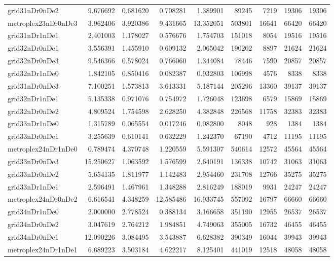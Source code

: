 \begin{longtable}{|l|r|r|r|r|r|r|r|r|}
grid31nDr0nDe2 & 9.676692 & 0.681620 & 0.708281 & 1.389901 & 89245 & 7219 & 19306 & 19306 \\
metroplex23nDr0nDe3 & 3.962406 & 3.920386 & 9.431665 & 13.352051 & 503801 & 16641 & 66420 & 66420 \\
grid31nDr1nDe1 & 2.401003 & 1.178027 & 0.576676 & 1.754703 & 151018 & 8054 & 19516 & 19516 \\
grid32nDr0nDe1 & 3.556391 & 1.455910 & 0.609132 & 2.065042 & 190202 & 8897 & 21624 & 21624 \\
grid32nDr0nDe3 & 9.546366 & 0.578024 & 0.766060 & 1.344084 & 78446 & 7590 & 20857 & 20857 \\
grid32nDr1nDe0 & 1.842105 & 0.850416 & 0.082387 & 0.932803 & 106998 & 4576 & 8338 & 8338 \\
grid31nDr0nDe3 & 7.100251 & 1.573813 & 3.613331 & 5.187144 & 205296 & 13360 & 39137 & 39137 \\
grid32nDr1nDe1 & 5.135338 & 0.971076 & 0.754972 & 1.726048 & 123698 & 6579 & 15869 & 15869 \\
grid32nDr0nDe2 & 4.809524 & 1.754598 & 2.628250 & 4.382848 & 226568 & 11758 & 32383 & 32383 \\
grid33nDr1nDe0 & 1.315789 & 0.065554 & 0.017246 & 0.082800 & 8048 & 928 & 1384 & 1384 \\
grid33nDr0nDe1 & 3.255639 & 0.610141 & 0.632229 & 1.242370 & 67190 & 4712 & 11195 & 11195 \\
metroplex24nDr1nDe0 & 0.789474 & 4.370748 & 1.220559 & 5.591307 & 540614 & 12572 & 45564 & 45564 \\
grid33nDr0nDe3 & 15.250627 & 1.063592 & 1.576599 & 2.640191 & 136338 & 10742 & 31063 & 31063 \\
grid33nDr0nDe2 & 5.654135 & 1.811977 & 1.142483 & 2.954460 & 231708 & 12766 & 35275 & 35275 \\
grid33nDr1nDe1 & 2.596491 & 1.467961 & 1.348288 & 2.816249 & 188019 & 9931 & 24247 & 24247 \\
metroplex24nDr0nDe2 & 6.616541 & 4.348259 & 12.585486 & 16.933745 & 557092 & 16797 & 66660 & 66660 \\
grid34nDr1nDe0 & 2.000000 & 2.778524 & 0.388134 & 3.166658 & 351190 & 12955 & 26537 & 26537 \\
grid34nDr0nDe2 & 3.047619 & 2.764212 & 1.984851 & 4.749063 & 355005 & 16732 & 46455 & 46455 \\
grid34nDr0nDe1 & 12.090226 & 3.084495 & 3.543887 & 6.628382 & 390349 & 16044 & 39943 & 39943 \\
metroplex24nDr1nDe1 & 6.689223 & 3.503184 & 4.622217 & 8.125401 & 441019 & 12518 & 48058 & 48058 \\

\end{longtable}
